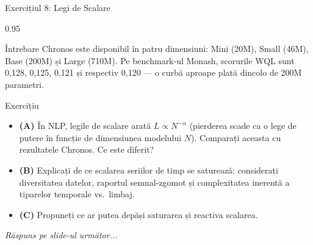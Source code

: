 \documentclass[9pt, aspectratio=169, t]{beamer}
\begin{document}
\begin{frame}{Exercițiul 8: Legi de Scalare}
    \begin{cminipage}{0.95\textwidth}
    \begin{alertblock}{Întrebare}
        Chronos este disponibil în patru dimensiuni: Mini (20M), Small (46M), Base (200M) și Large (710M). Pe benchmark-ul Monash, scorurile WQL sunt 0,128, 0,125, 0,121 și respectiv 0,120 --- o curbă aproape plată dincolo de 200M parametri.
    \end{alertblock}

    \vspace{0.2cm}

    \begin{block}{Exercițiu}
        \begin{itemize}\setlength{\itemsep}{3pt}
            \item \textcolor{MainBlue}{\textbf{(A)}} În NLP, legile de scalare arată $L \propto N^{-\alpha}$ (pierderea scade ca o lege de putere în funcție de dimensiunea modelului $N$). Comparați aceasta cu rezultatele Chronos. Ce este diferit?
            \item \textcolor{MainBlue}{\textbf{(B)}} Explicați de ce scalarea seriilor de timp se saturează: considerați diversitatea datelor, raportul semnal-zgomot și complexitatea inerentă a tiparelor temporale vs.\ limbaj.
            \item \textcolor{MainBlue}{\textbf{(C)}} Propuneți ce ar putea depăși saturarea și reactiva scalarea.
        \end{itemize}
    \end{block}

    \vspace{0.2cm}

    \begin{center}
        \textit{Răspuns pe slide-ul următor...}
    \end{center}
    \end{cminipage}
\end{frame}
\end{document}
